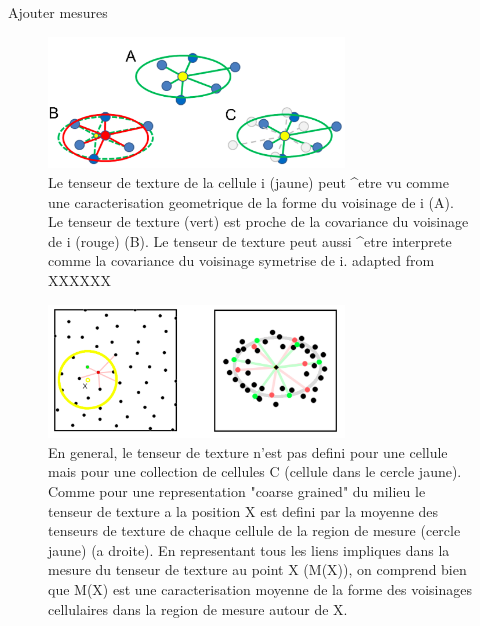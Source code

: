    Ajouter mesures 
\begin{figure}
\begin{center}
\includegraphics[width=0.7\textwidth]{../../images/Reconstruction/these_lombardot/p93_texture_tensor.png}
\end{center}
\caption{Le tenseur de texture de la cellule i (jaune) peut ^etre vu comme une caracterisation geometrique de la forme du voisinage de i (A). Le tenseur de texture (vert) est proche de la covariance du voisinage de i (rouge) (B). Le tenseur de texture peut aussi ^etre interprete comme la covariance du voisinage symetrise de i. adapted from XXXXXX}
\label{these_lombardot_p93_texture_tensor}
\end{figure}
\begin{figure}
\begin{center}
\includegraphics[width=0.7\textwidth]{../../images/Reconstruction/these_lombardot/p94_texture_tensor_average.png}
\end{center}
\caption{En general, le tenseur de texture n'est pas defini pour une cellule mais pour une collection de cellules C (cellule dans le cercle jaune). Comme pour une representation "coarse grained" du milieu le tenseur de texture a la position X est defini par la moyenne des tenseurs de texture de chaque cellule de la region de mesure (cercle jaune) (a droite). En representant tous les liens impliques dans la mesure du tenseur de texture au point X (M(X)), on comprend bien que M(X) est une caracterisation moyenne de la forme des voisinages cellulaires dans la region de mesure autour de X.}
\label{these_lombardot_p94_texture_tensor_average}
\end{figure}
